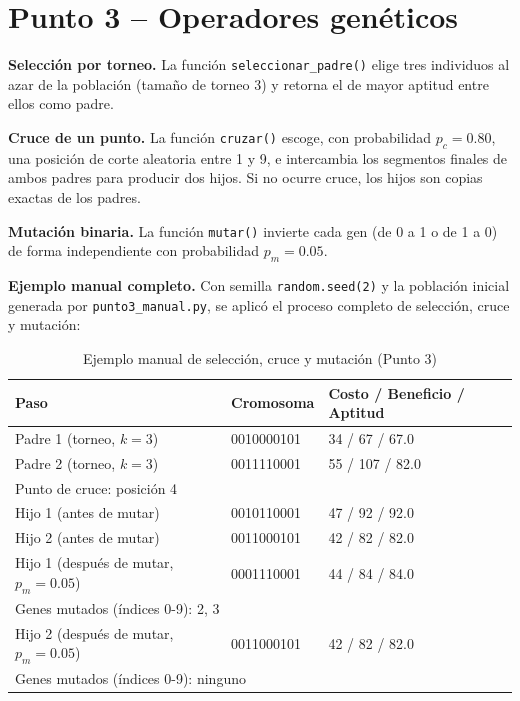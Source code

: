 \documentclass[12pt,a4paper]{article}
\begin{document}
\section{Punto 3 -- Operadores gen\'{e}ticos}

\textbf{Selecci\'{o}n por torneo.} La funci\'{o}n
\texttt{seleccionar\_padre()} elige tres individuos al azar de la
poblaci\'{o}n (tama\~{n}o de torneo 3) y retorna el de mayor aptitud
entre ellos como padre.

\textbf{Cruce de un punto.} La funci\'{o}n \texttt{cruzar()} escoge,
con probabilidad $p_c = 0.80$, una posici\'{o}n de corte aleatoria
entre 1 y 9, e intercambia los segmentos finales de ambos padres
para producir dos hijos. Si no ocurre cruce, los hijos son copias
exactas de los padres.

\textbf{Mutaci\'{o}n binaria.} La funci\'{o}n \texttt{mutar()} invierte
cada gen (de 0 a 1 o de 1 a 0) de forma independiente con
probabilidad $p_m = 0.05$.

\textbf{Ejemplo manual completo.} Con semilla \texttt{random.seed(2)}
y la poblaci\'{o}n inicial generada por \texttt{punto3\_manual.py}, se
aplic\'{o} el proceso completo de selecci\'{o}n, cruce y mutaci\'{o}n:

\begin{table}[H]
\centering
\caption{Ejemplo manual de selecci\'{o}n, cruce y mutaci\'{o}n (Punto 3)}
\label{tab:punto3}
\begin{tabular}{lll}
\toprule
\textbf{Paso} & \textbf{Cromosoma} & \textbf{Costo / Beneficio / Aptitud} \\
\midrule
Padre 1 (torneo, $k=3$)         & 0010000101 & 34 / 67 / 67.0 \\
Padre 2 (torneo, $k=3$)         & 0011110001 & 55 / 107 / 82.0 \\
\midrule
\multicolumn{3}{l}{Punto de cruce: posici\'{o}n 4} \\
Hijo 1 (antes de mutar)         & 0010110001 & 47 / 92 / 92.0 \\
Hijo 2 (antes de mutar)         & 0011000101 & 42 / 82 / 82.0 \\
\midrule
Hijo 1 (despu\'{e}s de mutar, $p_m=0.05$) & 0001110001 & 44 / 84 / 84.0 \\
\multicolumn{3}{l}{\quad Genes mutados (\'{i}ndices 0-9): 2, 3} \\
Hijo 2 (despu\'{e}s de mutar, $p_m=0.05$) & 0011000101 & 42 / 82 / 82.0 \\
\multicolumn{3}{l}{\quad Genes mutados (\'{i}ndices 0-9): ninguno} \\
\bottomrule
\end{tabular}
\end{table}
\end{document}

